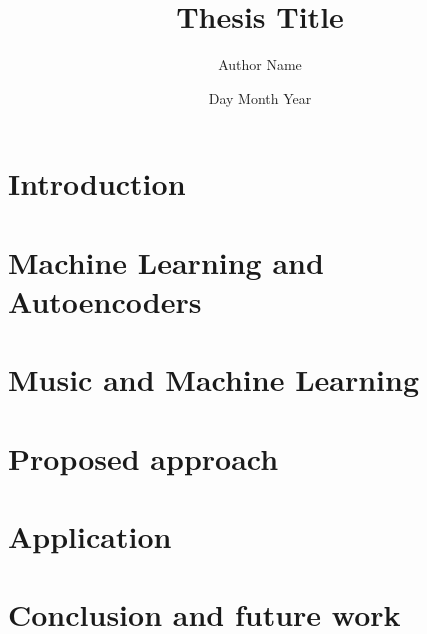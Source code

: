 \documentclass[12pt,twoside]{report}
\title{Thesis Title}
\author{Author Name}
\date{Day Month Year}
\begin{document}







\tableofcontents

\listoffigures


\renewcommand\listoflistingscaption{List of source codes}
\listoflistings


\chapter{Introduction}


\chapter{Machine Learning and Autoencoders}


\chapter{Music and Machine Learning}


\chapter{Proposed approach}


\chapter{Application}


\chapter{Conclusion and future work}


% 

% 



\end{document}
